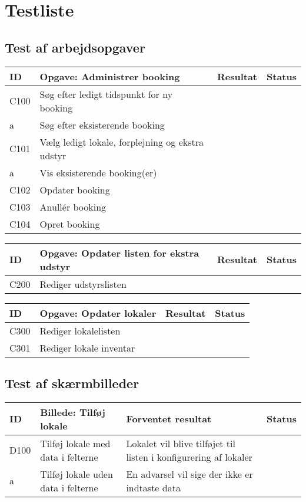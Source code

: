 \section{Testliste}
\label{App_Test_ListOfTest}

\subsection{Test af arbejdsopgaver}
\label{App_Test_ListOfTest_Work}

\begin{tabularx}{\textwidth}{ |X|X|X|X| }
\hline
	ID & Opgave: Administrer booking & Resultat & Status\\ 
\hline
	C100 & Søg efter ledigt tidspunkt for ny booking & & \\
\hline
	a & Søg efter eksisterende booking & & \\
\hline
	C101 & Vælg ledigt lokale, forplejning og ekstra udstyr & & \\
\hline
	a & Vis eksisterende booking(er) & & \\
\hline
	C102 & Opdater booking & & \\
\hline
	C103 & Anullér booking & & \\
\hline
	C104 & Opret booking & & \\
\hline
\end{tabularx}

\begin{tabularx}{\textwidth}{ |X|X|X|X| }
\hline
	ID & Opgave: Opdater listen for ekstra udstyr & Resultat & Status\\ 
\hline
	C200 & Rediger udstyrslisten & & \\
\hline
\end{tabularx}

\begin{tabularx}{\textwidth}{ |X|X|X|X| }
\hline
	ID & Opgave: Opdater lokaler & Resultat & Status\\ 
\hline
	C300 & Rediger lokalelisten & & \\
\hline
	C301 & Rediger lokale inventar & & \\
\hline
\end{tabularx}


\subsection{Test af skærmbilleder}
 \label{App_Test_ListOfTest_ScreenTests}

\begin{tabularx}{\textwidth}{ |X|X|X|X| }
\hline
	ID & Billede: Tilføj lokale  & Forventet resultat & Status\\ 
\hline
	D100 &Tilføj lokale med data i felterne & Lokalet vil blive tilføjet til listen i konfigurering af lokaler & \\
\hline
	a & Tilføj lokale uden data i felterne  & En advarsel vil sige der ikke er indtaste data & \\
\hline
\end{tabularx}

